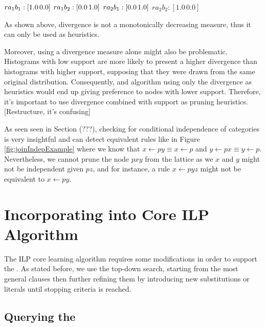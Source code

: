 $r a_1 b_1 : [1.0 \, 0.0] \\$
$r a_1 b_2 : [0.0 \, 1.0] \\$
$r a_2 b_1 : [0.0 \, 1.0] \\$
$r a_2 b_2 : [1.0 \, 0.0]$

As shown above, divergence is not a monotonically decreasing measure, thus it can only be used as heuristics.


Moreover, using a divergence measure alone might also be problematic. Histograms with low support are more likely to
present a higher divergence than histograms with higher support, supposing that they were drawn from the same original
distribution. Consequently, and algorithm using only the divergence as heuristics would end up giving preference to
nodes with lower support. Therefore, it's important to use divergence combined with support as pruning heuristics.
[Restructure, it's confusing]




As seen seen in Section (???), checking for conditional independence of categories is very insightful and
can detect equivalent rules like in Figure \ref{fig:joinIndepExample} where we know that 
$x \leftarrow py \equiv x \leftarrow p$ and $y \leftarrow px \equiv y \leftarrow p$. Nevertheless, we cannot prune the
node $pxy$ from the lattice as we $x$ and $y$ might not be independent given $pz$, and for instance, a rule $x
\leftarrow pyz$ might not be equivalent to $x \leftarrow py$. 

\section{Incorporating \graphname into Core ILP Algorithm}

The ILP core learning algorithm requires some modifications in order to support the \graphname. As stated before, we use
the top-down search, starting from the most general clauses then further refining them by introducing new substitutions
or literals until stopping criteria is reached.

\subsection{Querying the \graphname}

